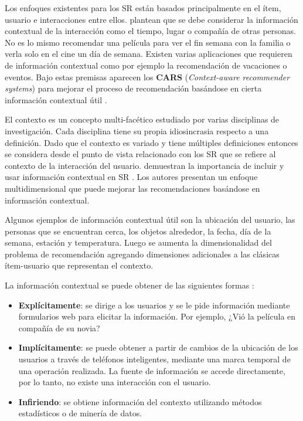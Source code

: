 Los enfoques existentes para los SR están basados principalmente en el ítem, usuario e  interacciones entre ellos. \cite{Adomavicius:2005} plantean que se debe considerar la información contextual de la interacción como el tiempo, lugar o compañía de otras personas. No es lo mismo recomendar una película para ver el fin semana con la familia o verla solo en el cine un día de semana. Existen varias aplicaciones que requieren de información contextual como por ejemplo la recomendación de vacaciones o eventos. Bajo estas premisas  aparecen los \textbf{CARS} (\textit{Context-aware recommender systems}) para mejorar el proceso de recomendación basándose en cierta información contextual útil \citep{Adomavicius:2011}.

El contexto es un concepto multi-facético estudiado por varias disciplinas de investigación. Cada disciplina tiene su propia idiosincrasia respecto a una definición. Dado que el contexto es variado y tiene múltiples definiciones entonces se considera desde el punto de vista relacionado con los SR que se refiere al contexto de la interacción del usuario. \cite{Adomavicius:2005:2} demuestran la importancia de incluir y usar información contextual en SR . Los autores presentan un enfoque multidimensional que puede mejorar las recomendaciones basándose en información contextual.

Algunos ejemplos de información contextual útil son la ubicación del usuario, las personas que se encuentran cerca, los objetos alrededor, la fecha, día de la semana, estación y temperatura. Luego se aumenta la dimensionalidad del problema de recomendación agregando  dimensiones adicionales a las clásicas ítem-usuario que representan el contexto.

La información contextual se puede obtener de las siguientes formas \citep{Adomavicius:2011}:

\begin{itemize}
\item \textbf{Explícitamente}: se dirige a los usuarios y se le pide información mediante formularios web para elicitar la información. Por ejemplo, ¿Vió  la película en compañía de su novia?
\item \textbf{Implícitamente}: se puede obtener a partir de cambios de la ubicación de los usuarios a través de teléfonos inteligentes, mediante una marca temporal de una operación realizada. La fuente de información se accede directamente, por lo tanto, no existe una interacción con el usuario.
\item \textbf{Infiriendo}: se obtiene información del contexto utilizando métodos estadísticos o de minería de datos.
\end{itemize}

